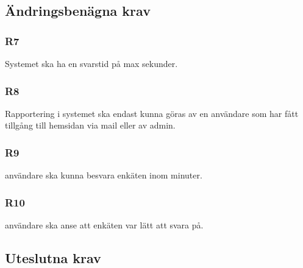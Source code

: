 \documentclass{article}
\begin{document}
     \subsection*{Ändringsbenägna krav}
     
     \subsubsection*{R7}
    Systemet ska ha en svarstid på max \underline{\hspace{1cm}} sekunder.
    
    \subsubsection*{R8}
    Rapportering i systemet ska endast kunna göras av en användare som har fått tillgång till hemsidan via mail eller av admin.
    
     \subsubsection*{R9}
   \underline{\hspace{1cm}} användare ska kunna besvara enkäten inom \underline{\hspace{1cm}} minuter.
    
    \subsubsection*{R10}
    \underline{\hspace{1cm}} användare ska anse att enkäten var lätt att svara på.
    
    \subsection*{Uteslutna krav}

\end{document}
